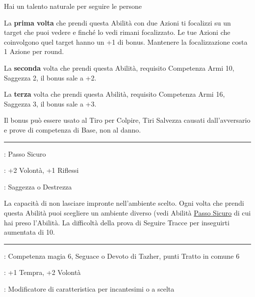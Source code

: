 \begin{multicols}{2}
Hai un talento naturale per seguire le persone

La \textbf{prima volta} che prendi questa Abilità con due Azioni ti focalizzi su un target che puoi vedere e finché lo vedi rimani focalizzato. Le tue Azioni che coinvolgono quel target hanno un +1 di bonus. Mantenere la focalizzazione costa 1 Azione per round.

La \textbf{seconda} volta che prendi questa Abilità, requisito Competenza Armi 10, Saggezza 2, il bonus sale a +2.

La \textbf{terza} volta che prendi questa Abilità, requisito Competenza Armi 16, Saggezza 3, il bonus sale a +3.

Il bonus può essere usato al Tiro per Colpire, Tiri Salvezza causati dall'avversario e prove di competenza di Base, non al danno.

\smallskip\noindent\rule{\linewidth}{2pt} \hypertarget{Senza Traccia}{}\medskip{}
\noindent
\begin{description}[noitemsep, topsep=0pt, parsep=0pt, partopsep=0pt, leftmargin=0cm, labelwidth=2.5cm]
    \item[\textbf{Requisito}]: Passo Sicuro
    \item[\textbf{Tiri Salvezza}]: +2 Volontà, +1 Riflessi
    \item[\textbf{Caratteristica}]: Saggezza o Destrezza
\end{description}

La capacità di non lasciare impronte nell'ambiente scelto. Ogni volta che prendi questa Abilità puoi scegliere un ambiente diverso (vedi Abilità \hyperlink{passosicuro}{Passo Sicuro} di cui hai preso l'Abilità. La difficoltà della prova di Seguire Tracce per inseguirti aumentata di 10.

\smallskip\noindent\rule{\linewidth}{2pt} \hypertarget{Sifone Nero}{}\medskip{}
\noindent
\begin{description}[noitemsep, topsep=0pt, parsep=0pt, partopsep=0pt, leftmargin=0cm, labelwidth=2.5cm]
    \item[\textbf{Requisito}]: Competenza magia 6, Seguace o Devoto di Tazher, punti Tratto in comune 6
    \item[\textbf{Tiri Salvezza}]: +1 Tempra, +2 Volontà
    \item[\textbf{Caratteristica}]: Modificatore di caratteristica per incantesimi o a scelta
\end{description}


\end{multicols}
